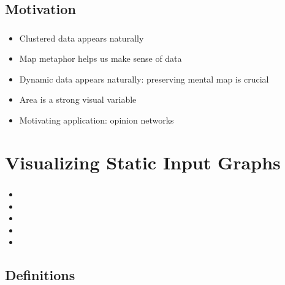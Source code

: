 \documentclass[t,18pt]{beamer}
\begin{document}
\subsection{Motivation}
\label{subsect:motivation}

\begin{frame}
  \frametitle{}
  \begin{itemize}
    \item Clustered data appears naturally
    \item Map metaphor helps us make sense of data
    \item Dynamic data appears naturally: preserving mental map is crucial
    \item Area is a strong visual variable
    \item Motivating application: opinion networks
  \end{itemize}
\end{frame}





\section{Visualizing Static Input Graphs}
\label{sect:visualizing-static-input-graphs}

\begin{frame}
  \frametitle{}
  \begin{itemize}
    \item {}
    \item {}
    \item {}
    \item {}
    \item {}
  \end{itemize}
\end{frame}

\subsection{Definitions}
\label{subsect:definitions}
\end{document}
